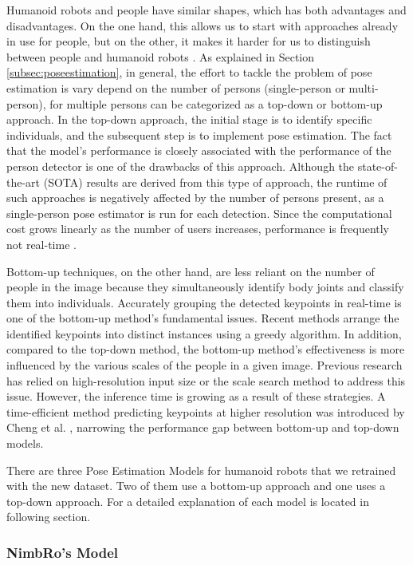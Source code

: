 Humanoid robots and people have similar shapes, which has both advantages and disadvantages. On the one hand, this allows us to start with approaches already in use for people, but on the other, it makes it harder for us to distinguish between people and humanoid robots \parencite{amini2021}.
As explained in Section \ref{subsec:poseestimation}, in general, the effort to tackle the problem of pose estimation is vary depend on the number of persons (single-person or multi-person), for multiple persons can be categorized as a top-down or bottom-up approach.
In the top-down approach, the initial stage is to identify specific individuals, and the subsequent step is to implement pose estimation. The fact that the model's performance is closely associated with the performance of the person detector is one of the drawbacks of this approach. Although the state-of-the-art (SOTA) results are derived from this type of approach,  the runtime of such approaches is negatively affected by the number of persons present,
as a single-person pose estimator is run for each detection. Since the computational cost grows linearly as the number of users increases, performance is frequently not real-time \parencite{amini2021}.

Bottom-up techniques, on the other hand, are less reliant on the number of people in the image because they simultaneously identify body joints and classify them into individuals. Accurately grouping the detected keypoints in real-time is one of the bottom-up method's fundamental issues.
Recent methods arrange the identified keypoints into distinct instances using a greedy algorithm. In addition, compared to the top-down method, the bottom-up method's effectiveness is more influenced by the various scales of the people in a given image. Previous research has relied on high-resolution input size \parencite{papandreou2018} or the scale search method \parencite{cao2019} to address this issue. However, the inference time is growing as a result of these strategies.
A time-efficient method predicting keypoints at higher resolution was introduced by Cheng et al. \parencite{cheng2020}, narrowing the performance gap between bottom-up and top-down models.

There are three Pose Estimation Models for humanoid robots that we retrained with the
new dataset. Two of them use a bottom-up approach and one uses a top-down approach. For a detailed explanation of each model is located in following section.

\subsubsection{NimbRo's Model}
\label{subsubsec:nimbromodel}

